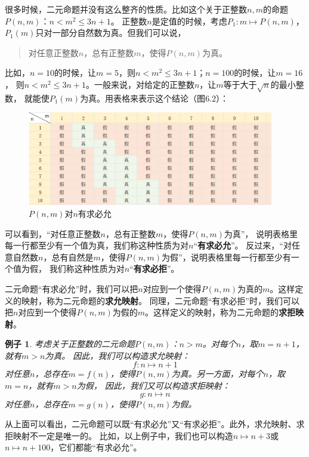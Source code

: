 \documentclass[12pt,UTF8]{ctexbook}
\newtheorem*{ex*}{例子}
\begin{document}
很多时候，二元命题并没有这么整齐的性质。比如这个关于正整数$n,m$的命题$P(n,m)$：$n < m^2 \leqslant 3n+1$。
正整数$n$是定值的时候，考虑$P_1 : m \mapsto P(n,m)$，$P_1(m)$只对一部分自然数为真。但我们可以说，
\begin{quotation}
    对任意正整数$n$，总有正整数$m$，使得$P(n,m)$为真。
\end{quotation}
比如，$n=10$的时候，让$m = 5$，则$n < m^2 \leqslant 3n+1$；$n=100$的时候，让$m = 16$，
则$n < m^2 \leqslant 3n+1$。一般来说，对给定的正整数$n$，让$m$等于大于$\sqrt{n}$的最小整数，
就能使$P_1(m)$为真。用表格来表示这个结论（图$6.2$）：
\begin{figure}[H] %
    \vspace{4pt}
    \centering
    \includegraphics[width=0.96\textwidth]{tu/多元映射12.png}
    \caption{$P(n,m)$对$n$有求必允}
\end{figure}

可以看到，“对任意正整数$n$，总有正整数$m$，使得$P(n,m)$为真”，
说明表格里每一行都至少有一个值为真，我们称这种性质为对$n$“\textbf{有求必允}”。
反过来，“对任意自然数$n$，总有自然是$m$，使得$P(n,m)$为假”，说明表格里每一行都至少有一个值为假，
我们称这种性质为对$n$“\textbf{有求必拒}”。

二元命题“有求必允”时，我们可以把$n$对应到一个使得$P(n,m)$为真的$m$。这样定义的映射，称为二元命题的\textbf{求允映射}。
同理，二元命题“有求必拒”时，我们可以把$n$对应到一个使得$P(n,m)$为假的$m$。这样定义的映射，称为二元命题的\textbf{求拒映射}。

\begin{ex*}
    考虑关于正整数的二元命题$P(n,m)$：$n > m$。对每个$n$，取$m = n + 1$，就有$m > n$为真。
    因此，我们可以构造求允映射：
$$f: n \mapsto n + 1$$
对任意$n$，总存在$m = f(n)$，使得$P(n,m)$为真。另一方面，对每个$n$，取$m = n$，就有$m > n$为假，
因此，我们又可以构造求拒映射：
$$g: n \mapsto n $$
对任意$n$，总存在$m = g(n)$，使得$P(n,m)$为假。
\end{ex*}

从上面可以看出，二元命题可以既“有求必允”又“有求必拒”。此外，求允映射、求拒映射不一定是唯一的。
比如，以上例子中，我们也可以构造$n \mapsto n + 3$或$n \mapsto n + 100$，它们都能“有求必允”。
\end{document}
